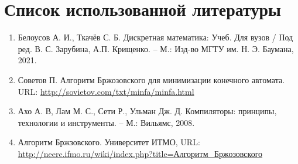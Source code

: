 \documentclass{bmstu-gost-7-32}
\begin{document}
\section*{Список использованной литературы}

\begin{enumerate}
	\item Белоусов А. И., Ткачёв С. Б. Дискретная математика: Учеб. Для вузов / Под ред. В. С. Зарубина, А.П. Крищенко. – М.: Изд-во МГТУ им. Н. Э. Баумана, 2021.
	\item Советов П. Алгоритм Бржозовского для минимизации конечного автомата. URL: \url{http://sovietov.com/txt/minfa/minfa.html}
	\item Ахо А. В, Лам М. С., Сети Р., Ульман Дж. Д. Компиляторы: принципы, технологии и инструменты. – М.: Вильямс, 2008.
	\item Алгоритм Бржзовского. Университет ИТМО, URL: \href{http://neerc.ifmo.ru/wiki/index.php?title=%
		\%D0\%90\%D0\%BB\%D0\%B3\%D0\%BE\%D1\%80\%D0\%B8\%D1\%82\%D0\%BC_%
		\%D0\%91\%D1\%80\%D0\%B6\%D0\%BE\%D0\%B7\%D0\%BE\%D0\%B2\%D1\%81\%D0\%BA\%D0\%BE\%D0\%B3\%D0\%BE}%
	{http://neerc.ifmo.ru/wiki/index.php?title=Алгоритм\_Бржозовского}
\end{enumerate}
\end{document}
